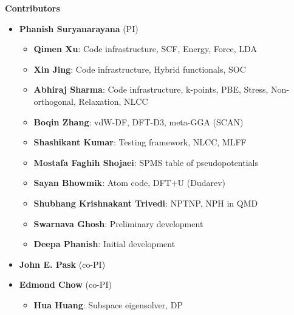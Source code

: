   \begin{frame}[allowframebreaks]{\textbf{Contributors}} \label{Contributors}

	\begin{itemize}
	\item \textbf{Phanish Suryanarayana} (PI)
	\begin{itemize}
 	    \item \textbf{Qimen Xu}: Code infrastructure, SCF, Energy, Force, LDA \\  
        \item \textbf{Xin Jing}: Code infrastructure, Hybrid functionals, SOC \\  
 	    \item \textbf{Abhiraj Sharma}: Code infrastructure, k-points, PBE, Stress, Non-orthogonal, Relaxation, NLCC \\   
 	    \item \textbf{Boqin Zhang}: vdW-DF, DFT-D3, meta-GGA (SCAN) \\  
 	    \item \textbf{Shashikant Kumar}: Testing framework, NLCC, MLFF \\  
            \item \textbf{Mostafa Faghih Shojaei}: SPMS table of pseudopotentials \\ 
            \item \textbf{Sayan Bhowmik\footnotemark[1]}: Atom code, DFT+U (Dudarev) \\
            \item \textbf{Shubhang Krishnakant Trivedi}: NPTNP, NPH in QMD\\
            \item \textbf{Swarnava Ghosh}: Preliminary development \\
            \item \textbf{Deepa Phanish}: Initial development
 	\end{itemize}
    \item \textbf{John E. Pask} (co-PI)
    \item \textbf{Edmond Chow} (co-PI)
    \begin{itemize}
        \item \textbf{Hua Huang}: Subspace eigensolver, DP

\end{itemize}
\end{itemize}
\end{frame}

